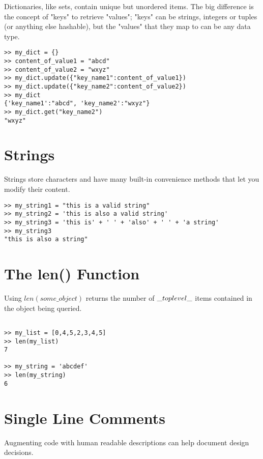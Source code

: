 \documentclass[12pt,a4paper,final,twoside,onecolumn,titlepage]{book}
\begin{document}
Dictionaries, like sets, contain unique but unordered items. The big difference is the concept of "keys" to retrieve "values"; "keys" can be strings, integers or tuples (or anything else hashable), but the "values" that they map to can be any data type.

\lstset{language=Python, tabsize=4}
\begin{lstlisting}
>> my_dict = {}
>> content_of_value1 = "abcd"
>> content_of_value2 = "wxyz"
>> my_dict.update({"key_name1":content_of_value1})
>> my_dict.update({"key_name2":content_of_value2})
>> my_dict
{'key_name1':"abcd", 'key_name2':"wxyz"}
>> my_dict.get("key_name2")
"wxyz"
\end{lstlisting}

\section{Strings}

Strings store characters and have many built-in convenience methods that let you modify their content.

\lstset{language=Python, tabsize=4}
\begin{lstlisting}
>> my_string1 = "this is a valid string"
>> my_string2 = 'this is also a valid string'
>> my_string3 = 'this is' + ' ' + 'also' + ' ' + 'a string'
>> my_string3
"this is also a string"
\end{lstlisting}

\section{The len() Function}

Using $len(some\_object)$ returns the number of $\_top\-level\_$ items contained in the object being queried.

\lstset{language=Python, tabsize=4}
\begin{lstlisting}

>> my_list = [0,4,5,2,3,4,5]
>> len(my_list)
7

>> my_string = 'abcdef'
>> len(my_string)
6
\end{lstlisting}


\section{Single Line Comments}

Augmenting code with human readable descriptions can help document design decisions.
\end{document}
